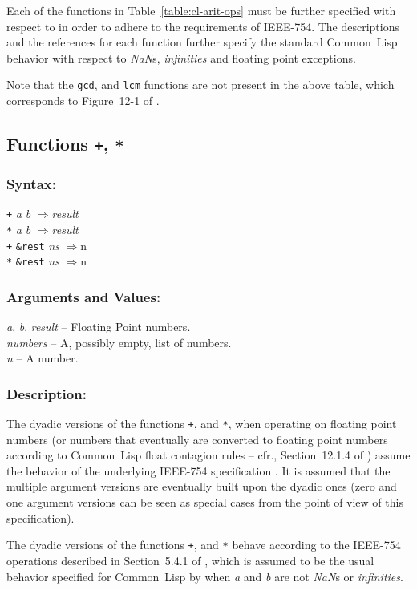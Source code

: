 \documentclass[10pt,fleqn]{article}
\newcommand{\CL}{\textsf{Common~Lisp}}
\newcommand{\code}[1]{\texttt{#1}}
\newcommand{\varname}[1]{\textit{#1}}
\newcommand{\RArrow}{$\Rightarrow$}
\newcommand{\IEEEFPStd}{IEEE-754}
\newcommand{\DDictionaryItem}[1]{\vspace*{6pt}\noindent\hrulefill\vspace*{-9pt}\subsection*{#1}}
\newcommand{\DSyntax}{\subsubsection*{Syntax:}}
\newcommand{\DArgsNValues}{\subsubsection*{Arguments and Values:}}
\newcommand{\DDescription}{\subsubsection*{Description:}}
\begin{document}
\noindent
Each of the functions in Table~\ref{table:cl-arit-ops} must be further
specified with respect to \cite{1996:ANSIHyperSpec} in order to adhere to
the requirements of \IEEEFPStd{}.  The descriptions and the references for
each function further specify the standard \CL{} behavior with respect
to \emph{NaN}s, \emph{infinities} and floating point exceptions.

\vspace*{3mm}

\noindent
Note that the \code{gcd}, and \code{lcm} functions are not
present in the above table, which corresponds to Figure~12-1 of
\cite{1996:ANSIHyperSpec}.


\DDictionaryItem{Functions \code{+}, \code{*}}
\index{*!\code{+}}
\index{*!\code{*}}

\DSyntax{}

\code{+} \varname{a} \varname{b} \RArrow \varname{result}\\
\code{*} \varname{a} \varname{b} \RArrow \varname{result}\\
\code{+} \code{\&rest} \varname{ns} \RArrow \varname \code{n}\\
\code{*} \code{\&rest} \varname{ns} \RArrow \varname \code{n}\\

\DArgsNValues{}

\varname{a}, \varname{b}, \varname{result} -- Floating Point numbers.\\
\varname{numbers} -- A, possibly empty, list of numbers.\\
\varname{n} -- A number.



\DDescription{}

The dyadic versions of the functions \code{+}, and \code{*}, when operating on
floating point numbers (or numbers that eventually are converted to
floating point numbers according to \CL{} float contagion rules -- cfr.,
Section~12.1.4 of \cite{1996:ANSIHyperSpec}) assume the behavior of the
underlying \IEEEFPStd{} specification \cite{2008:IEEE-754}.  It is assumed that
the multiple argument versions are eventually built upon the dyadic
ones (zero and one argument versions can be seen as special cases from
the point of view of this specification).

The dyadic versions of the functions \code{+}, and \code{*} behave
according to the \IEEEFPStd{} operations described in Section~5.4.1 of
\cite{2008:IEEE-754}, which is assumed to be the usual behavior specified
for \CL{} by \cite{1996:ANSIHyperSpec} when \varname{a} and \varname{b} are
not \emph{NaN}s or \emph{infinities}.
\end{document}
